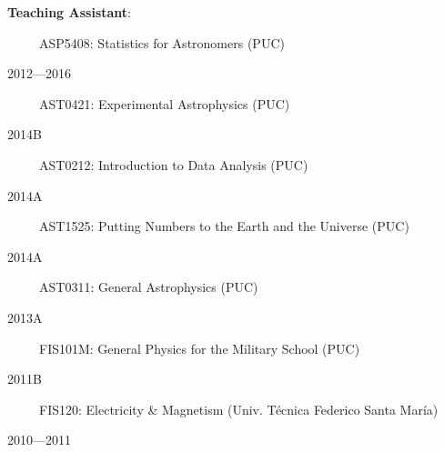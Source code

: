 \documentclass[12pt, a4paper]{article} %
\begin{document}
\begin{flushleft}%
  \setlength{\leftskip}{0.2cm}%
\textbf{Teaching Assistant}:
\end{flushleft}
\begin{minipage}[t]{0.6\textwidth}
\ \ \ \ \ ASP5408: Statistics for Astronomers (PUC)
\end{minipage}
\begin{minipage}[t]{0.4\textwidth}
\hfill 2012---2016
\end{minipage}
\begin{minipage}[t]{0.7\textwidth}
\ \ \ \ \ AST0421: Experimental Astrophysics (PUC)
\end{minipage}
\begin{minipage}[t]{0.3\textwidth}
\hfill 2014B
\end{minipage}
\begin{minipage}[t]{0.7\textwidth}
\ \ \ \ \ AST0212: Introduction to Data Analysis (PUC)
\end{minipage}
\begin{minipage}[t]{0.3\textwidth}
\hfill 2014A
\end{minipage}
\begin{minipage}[t]{0.7\textwidth}
\ \ \ \ \ AST1525: Putting Numbers to the Earth and the Universe (PUC)
\end{minipage}
\begin{minipage}[t]{0.3\textwidth}
\hfill 2014A
\end{minipage}
\begin{minipage}[t]{0.7\textwidth}
\ \ \ \ \ AST0311: General Astrophysics (PUC)
\end{minipage}
\begin{minipage}[t]{0.3\textwidth}
\hfill 2013A
\end{minipage}
\begin{minipage}[t]{0.7\textwidth}
\ \ \ \ \ FIS101M: General Physics for the Military School (PUC)
\end{minipage}
\begin{minipage}[t]{0.3\textwidth}
\hfill 2011B
\end{minipage}
\begin{minipage}[t]{0.7\textwidth}
\ \ \ \ \ FIS120: Electricity \& Magnetism (Univ. T\'ecnica Federico Santa Mar\'ia)
\end{minipage}
\begin{minipage}[t]{0.3\textwidth}
\hfill 2010---2011
\end{minipage}
\end{document}
